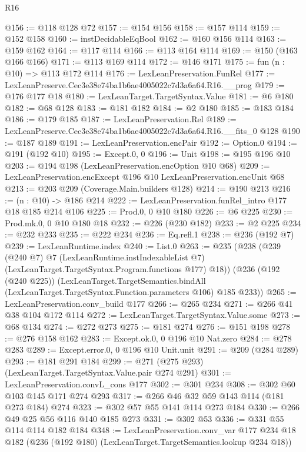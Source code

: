 \begin{lexlean}{R16}
\begin{coremodule}
@156 := @118 @128 @72
@157 := @154 @156
@158 := @157 @114
@159 := @152 @158
@160 := instDecidableEqBool
@162 := @160 @156 @114
@163 := @159 @162
@164 := @117 @114
@166 := @113 @164 @114
@169 := @150 (@163 @166 @166)
@171 := @113 @169 @114
@172 := @146 @171
@175 := fun (n : @10) => @113 @172 @114
@176 := LexLeanPreservation.FunRel
@177 := LexLeanPreserve.Cec3e38e74ba1b6ae4005022c7d3a6a64.R16.__prog
@179 := @176 @177 @18
@180 := LexLeanTarget.TargetSyntax.Value
@181 := @6 @180
@182 := @68 @128
@183 := @181 @182
@184 := @2 @180
@185 := @183 @184
@186 := @179 @185
@187 := LexLeanPreservation.Rel
@189 := LexLeanPreserve.Cec3e38e74ba1b6ae4005022c7d3a6a64.R16.__fits_0 @128
@190 := @187 @189
@191 := LexLeanPreservation.encPair
@192 := Option.{0}
@194 := @191 (@192 @10)
@195 := Except.{0, 0}
@196 := Unit
@198 := @195 @196 @10
@203 := @194 @198 (LexLeanPreservation.encOption @10 @68)
@209 := LexLeanPreservation.encExcept @196 @10 LexLeanPreservation.encUnit @68
@213 := @203 @209 (Coverage.Main.builders @128)
@214 := @190 @213
@216 := (n : @10) -> @186 @214
@222 := LexLeanPreservation.funRel_intro @177 @18 @185 @214 @106
@225 := Prod.{0, 0} @10 @180
@226 := @6 @225
@230 := Prod.mk.{0, 0} @10 @180 @18
@232 := @226 (@230 @182)
@233 := @2 @225
@234 := @232 @233
@235 := @222 @234
@236 := Eq.refl.{1}
@238 := @236 (@192 @7)
@239 := LexLeanRuntime.index
@240 := List.{0}
@263 := @235
    (@238
      (@239
        (@240 @7)
        @7
        (LexLeanRuntime.instIndexableList @7)
        (LexLeanTarget.TargetSyntax.Program.functions @177)
        @18))
    (@236
      (@192 (@240 @225))
      (LexLeanTarget.TargetSemantics.bindAll
        (LexLeanTarget.TargetSyntax.Function.parameters @106)
        @185
        @233))
@265 := LexLeanPreservation.conv_build @177
@266 := @265 @234
@271 := @266 @41 @38 @104 @172 @114
@272 := LexLeanTarget.TargetSyntax.Value.some
@273 := @68 @134
@274 := @272 @273
@275 := @181 @274
@276 := @151 @198
@278 := @276 @158 @162
@283 := Except.ok.{0, 0} @196 @10 Nat.zero
@284 := @278 @283
@289 := Except.error.{0, 0} @196 @10 Unit.unit
@291 := @209 (@284 @289)
@293 := @181 @291 @184
@299 := @271 (@275 @293) (LexLeanTarget.TargetSyntax.Value.pair @274 @291)
@301 := LexLeanPreservation.convL_cons @177
@302 := @301 @234
@308 := @302 @60 @103 @145 @171 @274 @293
@317 := @266 @46 @32 @59 @143 @114 (@181 @273 @184) @274
@323 := @302 @57 @55 @141 @114 @273 @184
@330 := @266 @49 @25 @56 @116 @140 @185 @273
@331 := @302 @53
@336 := @331 @55 @114 @114 @182 @184
@348 := LexLeanPreservation.conv_var
    @177
    @234
    @18
    @182
    (@236 (@192 @180) (LexLeanTarget.TargetSemantics.lookup @234 @18))

\end{coremodule}
\end{lexlean}
